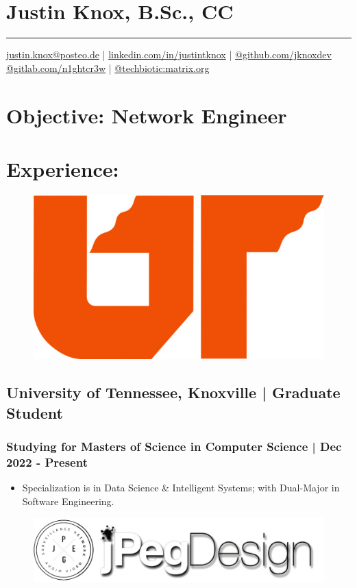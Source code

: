 \documentclass[letter,10pt]{article}
\author{jknox}
\date{\today}
\title{}
\begin{document}
\section*{Justin Knox, B.Sc., CC}
\label{sec:org303d69a}
\noindent\rule{\textwidth}{0.5pt}
\href{mailto:justin.knox@posteo.de}{justin.knox@posteo.de} | \href{https://www.linkedin.com/in/justintknox}{linkedin.com/in/justintknox} | \href{https://www.github.com/jknoxdev}{@github.com/jknoxdev} \\
\href{https://gitlab.com/n1ghtcr3w}{@gitlab.com/n1ghtcr3w} | \href{https://matrix.to/\#/@techbiotic:matrix.org}{@techbiotic:matrix.org}


\section*{Objective:              Network Engineer}
\label{sec:org1031fb1}
\section*{Experience:}
\label{sec:orgd5d3518}
\begin{figure}
\includegraphics[width=0.45\linewidth]{./img/50p_cr_utk.jpg}
\end{figure}

\subsection*{University of Tennessee, Knoxville | Graduate Student}
\label{sec:org967295f}
\subsubsection*{Studying for Masters of Science in Computer Science | Dec 2022 - Present}
\label{sec:org8e1e8e5}
\begin{itemize}
\item Specialization is in Data Science \& Intelligent Systems; with Dual-Major in Software Engineering.
\end{itemize}



\begin{figure}
\includegraphics[width=0.8\linewidth]{./img/jpeg_banner.jpg}
\end{figure}
\end{document}
